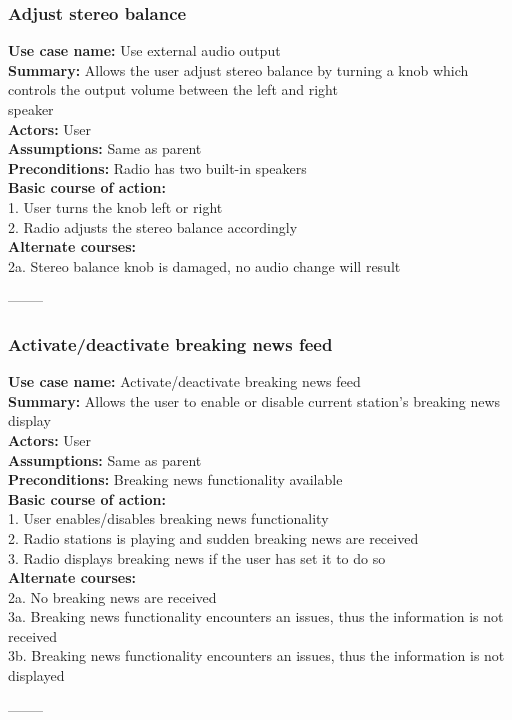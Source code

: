 \documentclass[11pt]{article}
\begin{document}
\subsubsection{Adjust stereo balance}
\textbf{Use case name:} Use external audio output\\
\textbf{Summary:} Allows the user adjust stereo balance by turning a knob which controls the output volume between the left and right\\
speaker\\
\textbf{Actors:} User\\
\textbf{Assumptions:} Same as parent\\
\textbf{Preconditions:} Radio has two built-in speakers\\
\textbf{Basic course of action:}\\
1. User turns the knob left or right\\
2. Radio adjusts the stereo balance accordingly\\
\textbf{Alternate courses:}\\
2a. Stereo balance knob is damaged, no audio change will result
\begin{center}--------\end{center}

\subsubsection{Activate/deactivate breaking news feed}
\textbf{Use case name:} Activate/deactivate breaking news feed\\
\textbf{Summary:} Allows the user to enable or disable current station's breaking news display\\
\textbf{Actors:} User\\
\textbf{Assumptions:} Same as parent\\
\textbf{Preconditions:} Breaking news functionality available\\
\textbf{Basic course of action:}\\
1. User enables/disables breaking news functionality\\
2. Radio stations is playing and sudden breaking news are received\\
3. Radio displays breaking news if the user has set it to do so\\
\textbf{Alternate courses:}\\
2a. No breaking news are received\\
3a. Breaking news functionality encounters an issues, thus the information is not received\\
3b. Breaking news functionality encounters an issues, thus the information is not displayed
\begin{center}--------\end{center}
\end{document}
